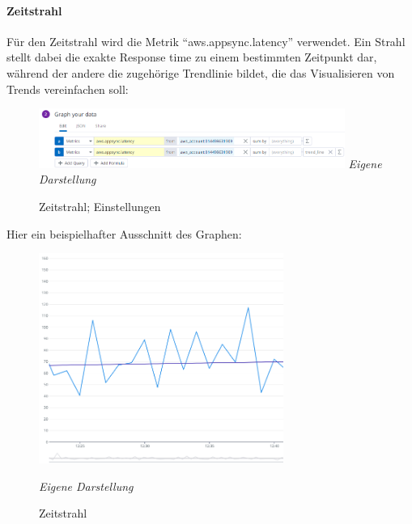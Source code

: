 \paragraph{Zeitstrahl}
Für den Zeitstrahl wird die Metrik ``aws.appsync.latency'' verwendet. Ein Strahl stellt dabei die exakte Response time zu einem bestimmten Zeitpunkt dar, während der andere die zugehörige Trendlinie bildet, die das Visualisieren von Trends vereinfachen soll:\newline

	\begin{figure}[H]
	\centering
	\begin{minipage}[t]{.7\textwidth} %
	\caption{Zeitstrahl; Einstellungen} %
	
	\includegraphics[width = 10cm,keepaspectratio]{graphOneSettings}\newline
	\textit{Eigene Darstellung} %
	\label{fig:zeitStrahlEinstellungen}
	\end{minipage}
	\end{figure}
	
	Hier ein beispielhafter Ausschnitt des Graphen:
	
	\begin{figure}[H]
	\centering
	\begin{minipage}[t]{.7\textwidth} %
	\caption{Zeitstrahl} %
	
	\includegraphics[width = 8cm,keepaspectratio]{graphOneItself} \newline
	
	\textit{Eigene Darstellung} %
	\label{fig:zeitstrahl}
	\end{minipage}
	\end{figure}
 
